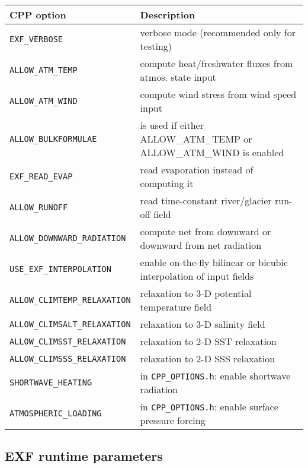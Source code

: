 \begin{table}[b!]
  \label{tab:pkg:exf:cpp}
  {\footnotesize
    \begin{tabular}{|l|l|}
      \hline
      \textbf{CPP option}  &  \textbf{Description}  \\
      \hline
        \texttt{EXF\_VERBOSE} & 
          verbose mode (recommended only for testing) \\
        \texttt{ALLOW\_ATM\_TEMP} & 
          compute heat/freshwater fluxes from atmos. state input \\
        \texttt{ALLOW\_ATM\_WIND} & 
          compute wind stress from wind speed input\\
        \texttt{ALLOW\_BULKFORMULAE} & 
          is used if either ALLOW\_ATM\_TEMP or ALLOW\_ATM\_WIND is enabled \\
        \texttt{EXF\_READ\_EVAP} & read evaporation instead of computing it \\
        \texttt{ALLOW\_RUNOFF} & read time-constant river/glacier run-off field \\
        \texttt{ALLOW\_DOWNWARD\_RADIATION} & compute net from downward or downward from net radiation \\
        \texttt{USE\_EXF\_INTERPOLATION} & enable on-the-fly bilinear or bicubic interpolation of input fields \\
      \hline
        \texttt{ALLOW\_CLIMTEMP\_RELAXATION} & 
          relaxation to 3-D potential temperature field \\
        \texttt{ALLOW\_CLIMSALT\_RELAXATION} & 
          relaxation to 3-D salinity field \\
        \texttt{ALLOW\_CLIMSST\_RELAXATION} &
          relaxation to 2-D SST relaxation \\
        \texttt{ALLOW\_CLIMSSS\_RELAXATION} &
          relaxation to 2-D SSS relaxation  \\
      \hline
        \texttt{SHORTWAVE\_HEATING} & in \texttt{CPP\_OPTIONS.h}: enable shortwave radiation \\
        \texttt{ATMOSPHERIC\_LOADING} &  in \texttt{CPP\_OPTIONS.h}: enable surface pressure forcing \\
      \hline
    \end{tabular}
  }
  \caption{~}
\end{table}



\subsection{EXF runtime parameters
\label{sec:pkg:exf:runtime}}

